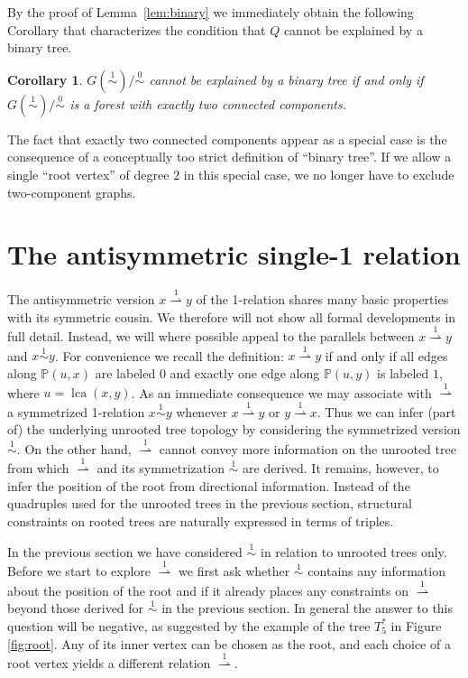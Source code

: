 \documentclass[smallextended]{svjour3}
\newcommand{\rev}[1]{\begingroup\color{blue}#1\endgroup}
\newcommand{\Ro}{\mathrel{\overset{0}{\sim}}}
\newcommand{\Rl}{\mathrel{\overset{1}{\sim}}}
\newcommand{\Rld}{\mathrel{\overset{1}{\rightharpoonup}}}
\newcommand{\lca}[1]{\mathop{lca}(#1)}
\newtheorem{cor}[thm]{Corollary}
\begin{document}
By the proof of Lemma~\ref{lem:binary} we immediately obtain the following
Corollary that characterizes the condition that $Q$ cannot be explained by
a binary tree.
\begin{cor}
  $G(\Rl)/\Ro$ cannot be explained by a binary tree if and only if
  $G(\Rl)/\Ro$ \rev{is a forest with} exactly two connected components.
\end{cor}
The fact that exactly two connected components appear as a special case is
the consequence of a conceptually too strict definition of ``binary
tree''. If we allow a single ``root vertex'' of degree $2$ in this special
case, we no longer have to exclude two-component graphs.

\section{The antisymmetric single-1 relation}
\label{sect:1dir}

The antisymmetric version $x\Rld y$ of the 1-relation shares many basic
properties with its symmetric cousin. We therefore will not show all formal
developments in full detail. Instead, we will where possible appeal to the
parallels between $x\Rld y$ and $x\Rl y$. For convenience we recall the
definition: $x \Rld y$ if and only if all edges along $\mathbb{P}(u,x)$ are
labeled $0$ and exactly one edge along $\mathbb{P}(u,y)$ is labeled $1$,
where $u=\lca{x,y}$. As an immediate consequence we may associate with
$\Rld$ a symmetrized 1-relation $x\Rl y$ whenever $x\Rld y$ or $y\Rld
x$. Thus we can infer (part of) the underlying unrooted tree topology by
considering the symmetrized version $\Rl$. On the other hand, $\Rld$ cannot
convey more information on the unrooted tree from which $\Rld$ and its
symmetrization $\Rl$ are derived. It remains, however, to infer the
position of the root from directional information. Instead of the
quadruples used for the unrooted trees in the previous section, structural
constraints on rooted trees are naturally expressed in terms of triples.


In the previous section we have considered $\Rl$ in relation to unrooted
trees only. Before we start to explore $\Rld$ we first ask whether $\Rl$
contains any information about the position of the root and if it already
places any constraints on $\Rld$ beyond those derived for $\Rl$ in the
previous section. In general the answer to this question will be negative,
as suggested by the example of the tree $T_5^*$ in Figure
\ref{fig:root}. Any of its inner vertex can be chosen as the root, and
each choice of a root vertex yields a different relation $\Rld$.
\end{document}
